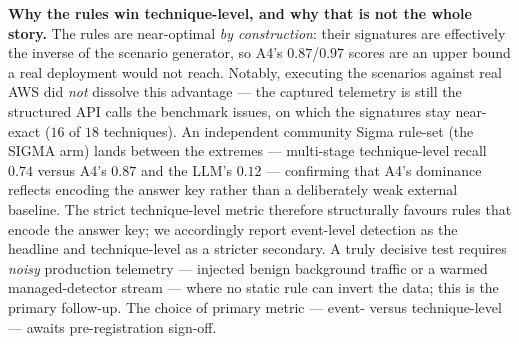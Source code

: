 \documentclass[journal]{IEEEtran}
\begin{document}
\textbf{Why the rules win technique-level, and why that is not the whole story.} The rules are near-optimal
\emph{by construction}: their signatures are effectively the inverse of the scenario generator, so A4's
$0.87$/$0.97$ scores are an upper bound a real deployment would not reach. Notably, executing the scenarios
against real AWS did \emph{not} dissolve this advantage --- the captured telemetry is still the structured API
calls the benchmark issues, on which the signatures stay near-exact ($16$ of $18$ techniques). An independent
community Sigma rule-set (the SIGMA arm) lands between the extremes --- multi-stage technique-level recall
$0.74$ versus A4's $0.87$ and the LLM's $0.12$ --- confirming that A4's dominance reflects encoding the answer
key rather than a deliberately weak external baseline. The strict technique-level metric therefore structurally
favours rules that encode the answer key; we accordingly report event-level detection as the headline and
technique-level as a stricter secondary. A truly decisive test requires \emph{noisy} production telemetry ---
injected benign background traffic or a warmed managed-detector stream --- where no static rule can invert the
data; this is the primary follow-up. The choice of primary metric --- event- versus technique-level --- awaits
pre-registration sign-off.

\end{document}
